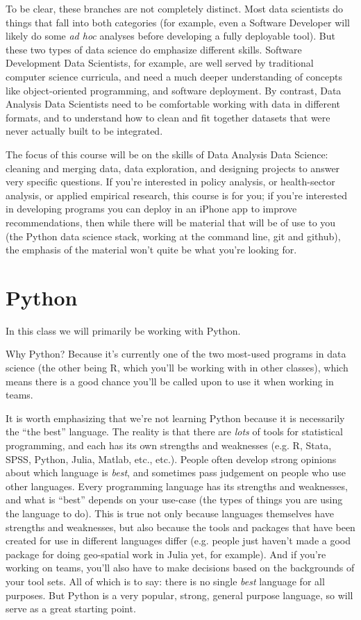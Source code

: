 \documentclass[12pt]{article}
\begin{document}
To be clear, these branches are not completely distinct. Most data scientists do things that fall into both categories (for example, even a Software Developer will likely do some \emph{ad hoc} analyses before developing a fully deployable tool). But these two types of data science do emphasize different skills. Software Development Data Scientists, for example, are well served by traditional computer science curricula, and need a much deeper understanding of concepts like object-oriented programming, and software deployment. By contrast, Data Analysis Data Scientists need to be comfortable working with data in different formats, and to understand how to clean and fit together datasets that were never actually built to be integrated.

The focus of this course will be on the skills of Data Analysis Data Science: cleaning and merging data, data exploration, and designing projects to answer very specific questions. If you're interested in policy analysis, or health-sector analysis, or applied empirical research, this course is for you; if you're interested in developing programs you can deploy in an iPhone app to improve recommendations, then while there will be material that will be of use to you (the Python data science stack, working at the command line, git and github), the emphasis of the material won't quite be what you're looking for.





\section{Python}

In this class we will primarily be working with Python.

Why Python? Because it's currently one of the two most-used programs in data science (the other being R, which you'll be working with in other classes), which means there is a good chance you'll be called upon to use it when working in teams.

It is worth emphasizing that we're not learning Python because it is necessarily the ``the best'' language. The reality is that there are \emph{lots} of tools for statistical programming, and each has its own strengths and weaknesses (e.g. R, Stata, SPSS, Python, Julia, Matlab, etc., etc.). People often develop strong opinions about which language is \emph{best}, and sometimes pass judgement on people who use other languages. Every programming language has its strengths and weaknesses, and what is ``best'' depends on your use-case (the types of things you are using the language to do). This is true not only because languages themselves have strengths and weaknesses, but also because the tools and packages that have been created for use in different languages differ (e.g. people just haven't made a good package for doing geo-spatial work in Julia yet, for example). And if you're working on teams, you'll also have to make decisions based on the backgrounds of your tool sets. All of which is to say: there is no single \emph{best} language for all purposes. But Python is a very popular, strong, general purpose language, so will serve as a great starting point.
\end{document}
